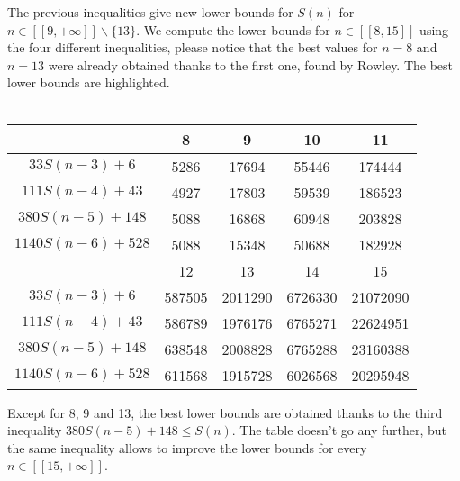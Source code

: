 The previous inequalities give new lower bounds for \(S(n)\) for
\( n \in [\![9,+\infty]\!] \backslash \{13\} \). We compute the lower
bounds for \( n \in [\![8,15]\!] \) using the four different inequalities, please notice that the best values for \( n = 8\) and \(n = 13\) were already obtained thanks to the first one, found by Rowley. The best lower bounds are highlighted.\\
\\
\begin{center}
\begin{tabular}{|*{5}{c|}}
    \hline
	 & 8 & 9 & 10 & 11 \\
	\hline
	\(33S(n-3) + 6 \) & \cellcolor{yellow} 5286 & 17694 & 55446 & 174444\\
	\hline
	\(111S(n-4) + 43 \) & 4927 & \cellcolor{yellow} 17803 & 59539 & 186523\\
	\hline
	\(380S(n-5) + 148 \) & 5088 & 16868 & \cellcolor{yellow} 60948 & \cellcolor{yellow} 203828 \\
	\hline
	\(1140S(n-6) + 528 \) & 5088 & 15348 & 50688 & 182928\\
	\hline
	\hline
	& 12 & 13 & 14 & 15 \\
	\hline
	\(33S(n-3) + 6 \) & 587505 & \cellcolor{yellow} 2011290 & 6726330 & 21072090\\
	\hline
	\(111S(n-4) + 43 \) & 586789 & 1976176 & 6765271 & 22624951 \\
	\hline
	\(380S(n-5) + 148 \) & \cellcolor{yellow} 638548 & 2008828 & \cellcolor{yellow} 6765288 & \cellcolor{yellow} 23160388 \\
	\hline
	\(1140S(n-6) + 528 \) & 611568 & 1915728 & 6026568 & 20295948 \\
	\hline
\end{tabular}
\end{center}
Except for 8, 9 and 13, the best lower bounds are obtained thanks to the third inequality \( 380S(n-5) + 148 \leqslant S(n) \). The table doesn't go any further, but the same inequality allows to improve the lower bounds for every \( n \in [\![15,+\infty]\!] \).